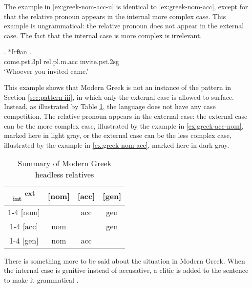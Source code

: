 The example in \ref{ex:greek-nom-acc-u} is identical to \ref{ex:greek-nom-acc}, except for that the relative pronoun appears in the internal  more complex case. This example is ungrammatical: the relative pronoun does not appear in the external case. The fact that the internal case is more complex is irrelevant.

\exg. *Irθan  .\\
come.\ac{pst}.3\ac{pl}\scsub{[nom]} \ac{rel}.\ac{pl}.\ac{m}.\ac{acc} invite.\ac{pst}.2\ac{sg}\scsub{[acc]}\\
`Whoever you invited came.'\label{ex:greek-nom-acc-u}

This example shows that Modern Greek is not an instance of the pattern in Section \ref{sec:pattern-iii}, in which only the external case is allowed to surface. Instead, as illustrated by Table \ref{tbl:no-case-competition-greek}, the language does not have any case competition. The relative pronoun appears in the external case: the external case can be the more complex case, illustrated by the example in \ref{ex:greek-acc-nom}, marked here in light gray, or the external case can be the less complex case, illustrated by the example in \ref{ex:greek-nom-acc}, marked here in dark gray.

\begin{table}[H]
  \center
  \caption{Summary of Modern Greek headless relatives}
  \begin{tabular}{c|c|c|c}
    \toprule
   \textsubscript{\ac{int}} \textsuperscript{\ac{ext}}
          & [\ac{nom}]
          & [\ac{acc}]
          & [\ac{gen}]
          \\ \cmidrule{1-4}
      [\ac{nom}]
          & \xcancel{\phantom{xx}}
          & \cellcolor{LG}\ac{acc}
          & \ac{gen}
          \\ \cmidrule{1-4}
      [\ac{acc}]
          & \cellcolor{DG}\ac{nom}
          & \xcancel{\phantom{xx}}
          & \ac{gen}
          \\ \cmidrule{1-4}
      [\ac{gen}]
          & \ac{nom}
          & \ac{acc}
          & \xcancel{\phantom{xx}}
          \\
    \bottomrule
  \end{tabular}
  \label{tbl:no-case-competition-greek}
\end{table}

There is something more to be said about the situation in Modern Greek. When the internal case is genitive instead of accusative, a clitic is added to the sentence to make it grammatical \citep{daskalaki2011}.

